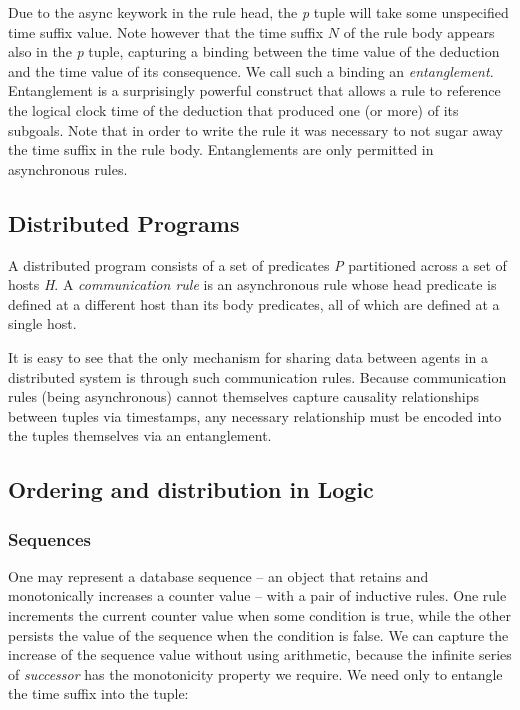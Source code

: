 Due to the async keywork in the rule head, the \emph{p} tuple will take some unspecified time suffix value.
Note however that the time suffix $N$ of the rule body appears also in the \emph{p} tuple, capturing a 
binding between the time value of the deduction and the time value of its consequence.  We call such a binding
an \emph{entanglement}.   Entanglement is a surprisingly powerful construct that allows a rule to 
reference the logical clock time of the deduction that produced one (or more) of its subgoals.  Note that in order
to write the rule it was necessary to not sugar away the time suffix in the rule body.  Entanglements are only 
permitted in asynchronous rules.

\subsection{Distributed Programs}

A distributed \lang program consists of a set of predicates \emph{P} partitioned across a set of hosts \emph{H}.
A \emph{communication rule} is an asynchronous rule whose head predicate is defined at a different host than its body predicates,
all of which are defined at a single host.  

It is easy to see that the only mechanism for sharing data between agents in a distributed system is through such communication 
rules.  Because communication rules (being asynchronous) cannot themselves capture causality relationships between tuples
via timestamps, any necessary relationship must be encoded into the tuples themselves via an entanglement.


\subsection{Ordering and distribution in Logic}

\subsubsection{Sequences}

One may represent a database sequence -- an object that retains and monotonically increases a counter value -- 
with a pair of inductive rules.  One rule increments the current counter value when some condition is 
true, while the other persists the value of the sequence when the condition is false.  We can capture the increase
of the sequence value without using arithmetic, because the infinite series of \emph{successor} has the monotonicity
property we require.  We need only to entangle the time suffix into the tuple:

